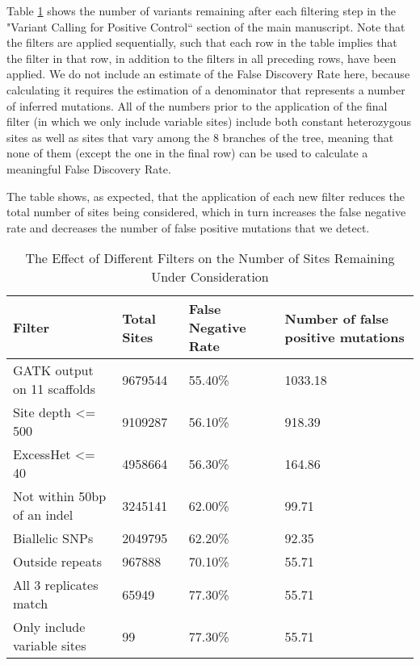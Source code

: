 Table \ref{table:supp_filter_summary} shows the number of variants remaining after each filtering step in the "Variant Calling for Positive Control`` section of the main manuscript. Note that the filters are applied sequentially, such that each row in the table implies that the filter in that row, in addition to the filters in all preceding rows, have been applied. We do not include an estimate of the False Discovery Rate here, because calculating it requires the estimation of a denominator that represents a number of inferred mutations. All of the numbers prior to the application of the final filter (in which we only include variable sites) include both constant heterozygous sites as well as sites that vary among the 8 branches of the tree, meaning that none of them (except the one in the final row) can be used to calculate a meaningful False Discovery Rate. 

The table shows, as expected, that the application of each new filter reduces the total number of sites being considered, which in turn increases the false negative rate and decreases the number of false positive mutations that we detect.

\begin{table}
\centering
\begin{tabularx}{\textwidth}{X X X X}
\toprule
Filter & Total Sites & False Negative Rate & Number of false positive mutations\\ 
\midrule
GATK output on 11 scaffolds & 9679544 & 55.40\% & 1033.18\\ 
Site depth <= 500 & 9109287 & 56.10\% & 918.39\\ 
ExcessHet <= 40 & 4958664 & 56.30\% & 164.86\\ 
Not within 50bp of an indel & 3245141 & 62.00\% & 99.71\\ 
Biallelic SNPs & 2049795 & 62.20\% & 92.35\\ 
Outside repeats & 967888 & 70.10\% & 55.71\\ 
All 3 replicates match & 65949 & 77.30\% & 55.71\\ 
Only include variable sites & 99 & 77.30\% & 55.71\\

\bottomrule
\end{tabularx}
\caption{The Effect of Different Filters on the Number of Sites Remaining Under Consideration}
\label{table:supp_filter_summary}
\end{table}

